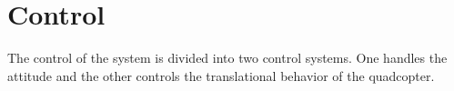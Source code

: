 \section{Control}
The control of the system is divided into two control systems. One handles the attitude and the other controls the translational behavior of the quadcopter.